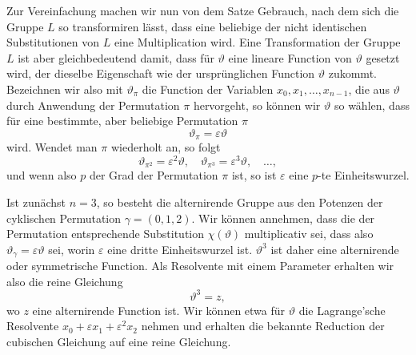 \documentclass[11pt]{article}
\begin{document}
Zur Vereinfachung machen wir nun von dem Satze Gebrauch, nach dem sich die Gruppe \(L\) so transformiren lässt, dass eine beliebige der nicht identischen Substitutionen von \(L\) eine Multiplication wird. Eine Transformation der Gruppe \(L\) ist aber gleichbedeutend damit, dass für \(\vartheta\) eine lineare Function von \(\vartheta\) gesetzt wird, der dieselbe Eigenschaft wie der ursprünglichen Function \(\vartheta\) zukommt. Bezeichnen wir also mit \(\vartheta_\pi\) die Function der Variablen \(x_0,x_1,\ldots,x_{n-1}\), die aus \(\vartheta\) durch Anwendung der Permutation \(\pi\) hervorgeht, so können wir \(\vartheta\) so wählen, dass für eine bestimmte, aber beliebige Permutation \(\pi\)
\[
\vartheta_\pi=\varepsilon\vartheta
\]
wird. Wendet man \(\pi\) wiederholt an, so folgt
\[
\vartheta_{\pi^2}=\varepsilon^2\vartheta,\quad
\vartheta_{\pi^3}=\varepsilon^3\vartheta,\quad\ldots,
\]
und wenn also \(p\) der Grad der Permutation \(\pi\) ist, so ist \(\varepsilon\) eine \(p\)-te Einheitswurzel.

Ist zunächst \(n=3\), so besteht die alternirende Gruppe aus den Potenzen der cyklischen Permutation \(\gamma=(0,1,2)\). Wir können annehmen, dass die der Permutation entsprechende Substitution \(\chi(\vartheta)\) multiplicativ sei, dass also \(\vartheta_\gamma=\varepsilon\vartheta\) sei, worin \(\varepsilon\) eine dritte Einheitswurzel ist. \(\vartheta^3\) ist daher eine alternirende oder symmetrische Function. Als Resolvente mit einem Parameter erhalten wir also die reine Gleichung
\[
\vartheta^3=z,
\]
wo \(z\) eine alternirende Function ist. Wir können etwa für \(\vartheta\) die Lagrange'sche Resolvente \(x_0+\varepsilon x_1+\varepsilon^2 x_2\) nehmen und erhalten die bekannte Reduction der cubischen Gleichung auf eine reine Gleichung.
\end{document}
